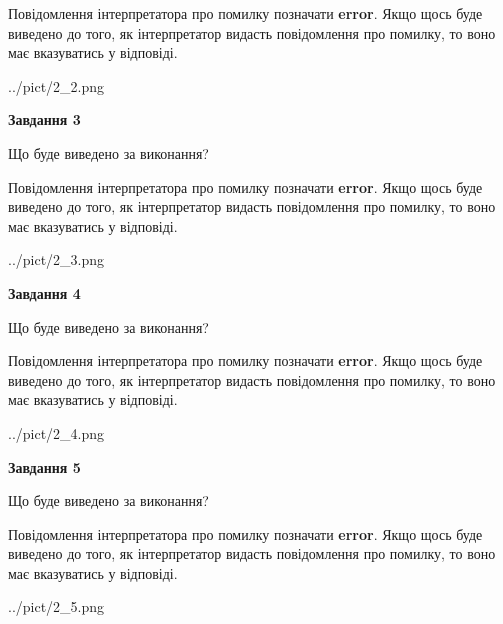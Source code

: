 \documentclass[12pt, ukrainian]{article}
\begin{document}
{\begin {large}
Повідомлення інтерпретатора про помилку позначати \textbf{error}.
Якщо щось буде виведено до того, як інтерпретатор видасть повідомлення про помилку, 
то воно має вказуватись у відповіді. \par


\begin{center}
	{../pict/2_2.png}
\end{center}
\newpage

{\begin {center}\textbf{Завдання 3}\end {center}}\par
Що буде виведено за виконання?

Повідомлення інтерпретатора про помилку позначати \textbf{error}.
Якщо щось буде виведено до того, як інтерпретатор видасть повідомлення про помилку, 
то воно має вказуватись у відповіді. \par


\begin{center}
	{../pict/2_3.png}
\end{center}
\newpage

{\begin {center}\textbf{Завдання 4}\end {center}}\par
Що буде виведено за виконання?

Повідомлення інтерпретатора про помилку позначати \textbf{error}.
Якщо щось буде виведено до того, як інтерпретатор видасть повідомлення про помилку, 
то воно має вказуватись у відповіді. \par


\begin{center}
	{../pict/2_4.png}
\end{center}
\newpage

{\begin {center}\textbf{Завдання 5}\end {center}}\par
Що буде виведено за виконання?

Повідомлення інтерпретатора про помилку позначати \textbf{error}.
Якщо щось буде виведено до того, як інтерпретатор видасть повідомлення про помилку, 
то воно має вказуватись у відповіді. \par


\begin{center}
	{../pict/2_5.png}
\end{center}
\newpage


\end{large}}
\end{document}
